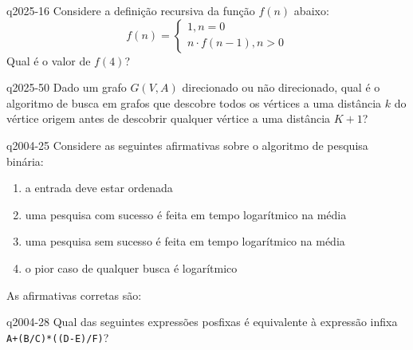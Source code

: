 \documentclass[10pt,a4paper]{article}
\begin{document}
{
\def\AMCbeginQuestion#1#2{\par\noindent{\bf (POSCOMP 2025 - Questão 16)}}
\begin{question}{q2025-16} Considere a definição recursiva da função $f(n)$ abaixo:
\[
f(n) = \begin{cases}
1,  n = 0 \\
n \cdot f(n - 1),  n > 0
\end{cases}
\]
Qual é o valor de $f(4)$?
\begin{choices}
\end{choices}
\end{question}
}

{
\def\AMCbeginQuestion#1#2{\par\noindent{\bf (POSCOMP 2025 - Questão 50)}}
\begin{question}{q2025-50} Dado um grafo $G(V,A)$ direcionado ou não direcionado, qual é o algoritmo de busca em grafos que descobre todos os vértices a uma distância $k$ do vértice origem antes de descobrir qualquer vértice a uma distância $K + 1$?
\begin{choices}
\end{choices}
\end{question}
}

{
\def\AMCbeginQuestion#1#2{\par\noindent{\bf (POSCOMP 2004 - Questão 25)}}
\begin{question}{q2004-25} Considere as seguintes afirmativas sobre o algoritmo de pesquisa binária:
\begin{enumerate}[label=\Roman*.]
\item a entrada deve estar ordenada
\item uma pesquisa com sucesso é feita em tempo logarítmico na média
\item uma pesquisa sem sucesso é feita em tempo logarítmico na média
\item o pior caso de qualquer busca é logarítmico
\end{enumerate}
As afirmativas corretas são:
\begin{choices}
\end{choices}
\end{question}
}

{
\def\AMCbeginQuestion#1#2{\par\noindent{\bf (POSCOMP 2004 - Questão 28)}}
\begin{question}{q2004-28} Qual das seguintes expressões posfixas é equivalente à expressão infixa \texttt{A+(B/C)*((D-E)/F)}?
\begin{choices}
\end{choices}
\end{question}
}
\end{document}
